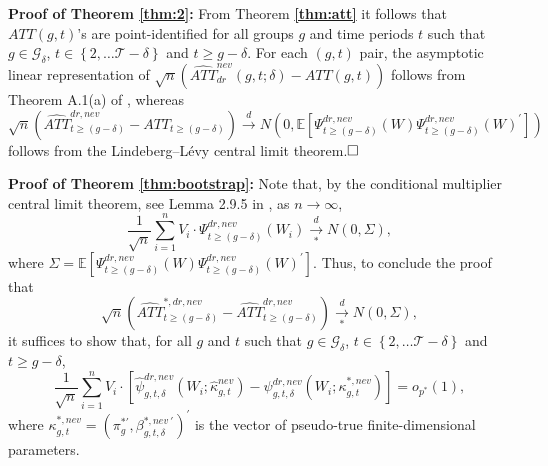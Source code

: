 \documentclass[11pt]{article}%
\theoremstyle{plain}
\numberwithin{sassumption}{section}
\numberwithin{equation}{section}
\begin{document}
{\small \textbf{Proof of Theorem \ref{thm:2}: }From Theorem
\textbf{\ref{thm:att}} it follows that $ATT\left(  g,t\right)  $'s are
point-identified for all groups $g$ and time periods $t$ such that
$g\in\mathcal{G}_{\delta}$, $t\in\left\{  2,\dots\mathcal{T-\delta}\right\}  $
and $t\geq g-\delta$. For each $(g,t)$ pair, the asymptotic linear
representation of $\sqrt{n}(\widehat{ATT}_{dr}^{nev}\left(  g,t;\delta\right)
-ATT\left(  g,t\right)  )$ follows from Theorem A.1(a) of \cite{SantAnna2020},
whereas
\[
\sqrt{n}(\widehat{ATT}_{t\geq\left(  g-\delta\right)  }^{dr,nev}%
-ATT_{t\geq\left(  g-\delta\right)  })\xrightarrow{d}N(0,\mathbb{E}%
[\Psi_{t\geq\left(  g-\delta\right)  }^{dr,nev}(W)\Psi_{t\geq\left(
g-\delta\right)  }^{dr,nev}(W)^{\prime}])
\]
follows from the Lindeberg--L\'{e}vy central limit theorem.$\square\bigskip$ }

{\small \noindent\textbf{Proof of Theorem \ref{thm:bootstrap}:} Note that, by
the conditional multiplier central limit theorem, see Lemma 2.9.5 in
\cite{VanderVaart1996}, as $n\rightarrow\infty$,%
\begin{equation}
\frac{1}{\sqrt{n}}\sum_{i=1}^{n}V_{i}\cdot\Psi_{t\geq\left(  g-\delta\right)
}^{dr,nev}(W_{i})\underset{\ast}{\overset{d}{\rightarrow}}N(0,\Sigma
),\label{eq:boot.0}%
\end{equation}
where $\Sigma=\mathbb{E}[\Psi_{t\geq\left(  g-\delta\right)  }^{dr,nev}%
(W)\Psi_{t\geq\left(  g-\delta\right)  }^{dr,nev}(W)^{\prime}].$ Thus, to
conclude the proof that
\[
\sqrt{n}\left(  \widehat{ATT}_{t\geq\left(  g-\delta\right)  }^{\ast
,dr,nev}-\widehat{ATT}_{t\geq\left(  g-\delta\right)  }^{dr,nev}\right)
\underset{\ast}{\overset{d}{\rightarrow}}N(0,\Sigma),
\]
it suffices to show that, for all $g$ and $t$ such that $g\in\mathcal{G}%
_{\delta}$, $t\in\left\{  2,\dots\mathcal{T-\delta}\right\}  $ and $t\geq
g-\delta$,
\begin{equation}
\frac{1}{\sqrt{n}}\sum_{i=1}^{n}V_{i}\cdot\left[  \widehat{\psi}_{g,t,\delta
}^{dr,nev}(W_{i};\widehat{\kappa}_{g,t}^{nev})-\psi_{g,t,\delta}%
^{dr,nev}(W_{i};\kappa_{g,t}^{\ast,nev})\right]  =o_{p^{\ast}}\left(
1\right)  ,\label{boot:needed}%
\end{equation}
where $\kappa_{g,t}^{\ast,nev}=\left(  \pi_{g}^{\ast\prime},\beta_{g,t,\delta
}^{\ast,nev~\prime}\right)  ^{\prime}$ is the vector of pseudo-true
finite-dimensional parameters. }
\end{document}
